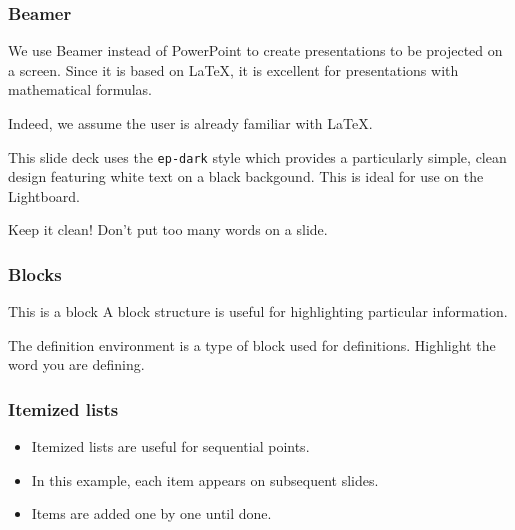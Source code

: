 \documentclass[t,14pt]{beamer}
\begin{document}
%
%

\titleframe


\begin{frame}
  \frametitle{Beamer}
  \large 

  We use \alert{Beamer} instead of PowerPoint to create presentations
  to be projected on a screen. Since it is based on \LaTeX, it is
  excellent for presentations with mathematical formulas.

  Indeed, we assume the user is already familiar with \LaTeX.
\end{frame}

\begin{frame}
  \large

  This slide deck uses the \texttt{ep-dark} style which provides a
  particularly simple, clean design featuring white text on a black
  backgound. This is ideal for use on the Lightboard.

  Keep it clean! Don't put too many words on a slide.
\end{frame}


\begin{frame}
  \frametitle{Blocks}
  \large
  \begin{block}{This is a block}
    A \alert{block} structure is useful for highlighting particular
    information.
  \end{block}

  \begin{definition}
    The \alert{definition} environment is a type of block used for
    definitions. Highlight the word you are defining.
  \end{definition}
\end{frame}

\begin{frame}
  \frametitle{Itemized lists}
  \large
  \begin{itemize}
  \item<+-> Itemized lists are useful for sequential points.
  \item<+-> In this example, each item appears on subsequent slides.
  \item<+-> Items are added one by one until done. 
  \end{itemize}
\end{frame}
\end{document}
